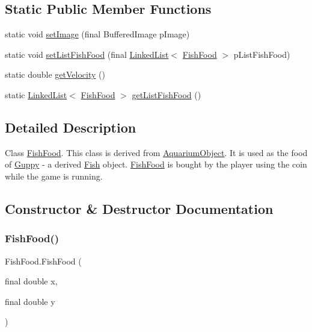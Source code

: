 \subsection*{Static Public Member Functions}
\begin{DoxyCompactItemize}
\item 
static void \mbox{\hyperlink{class_fish_food_a47a9051f2151bcbd87da5f07492bb6c9}{set\+Image}} (final Buffered\+Image p\+Image)
\item 
static void \mbox{\hyperlink{class_fish_food_ab2ad298b74bf3d3d0104ce0cffbaf7ff}{set\+List\+Fish\+Food}} (final \mbox{\hyperlink{class_linked_list}{Linked\+List}}$<$ \mbox{\hyperlink{class_fish_food}{Fish\+Food}} $>$ p\+List\+Fish\+Food)
\item 
static double \mbox{\hyperlink{class_fish_food_a70b3341a3d7018ed280e8e079806f3a0}{get\+Velocity}} ()
\item 
static \mbox{\hyperlink{class_linked_list}{Linked\+List}}$<$ \mbox{\hyperlink{class_fish_food}{Fish\+Food}} $>$ \mbox{\hyperlink{class_fish_food_aa35d784e5f8c59d1029fcb119eaf302b}{get\+List\+Fish\+Food}} ()
\end{DoxyCompactItemize}


\subsection{Detailed Description}
Class \mbox{\hyperlink{class_fish_food}{Fish\+Food}}. This class is derived from \mbox{\hyperlink{class_aquarium_object}{Aquarium\+Object}}. It is used as the food of \mbox{\hyperlink{class_guppy}{Guppy}} -\/ a derived \mbox{\hyperlink{interface_fish}{Fish}} object. \mbox{\hyperlink{class_fish_food}{Fish\+Food}} is bought by the player using the coin while the game is running. 

\subsection{Constructor \& Destructor Documentation}
\mbox{\label{class_fish_food_aa3c6283b8dcbf8fc6343051bb2cbb522}} 
\subsubsection{\texorpdfstring{Fish\+Food()}{FishFood()}}
{\footnotesize\ttfamily Fish\+Food.\+Fish\+Food (\begin{DoxyParamCaption}\item[{final double}]{x,  }\item[{final double}]{y }\end{DoxyParamCaption})\hspace{0.3cm}{\ttfamily [inline]}}

